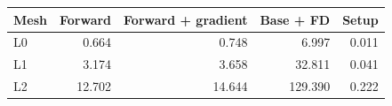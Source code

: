 \begin{tabular}{lrrrr}\toprule
Mesh & Forward & Forward + gradient & Base + FD & Setup\\\midrule
L0 & 0.664 & 0.748 & 6.997 & 0.011 \\
L1 & 3.174 & 3.658 & 32.811 & 0.041 \\
L2 & 12.702 & 14.644 & 129.390 & 0.222 \\
\bottomrule\end{tabular}

